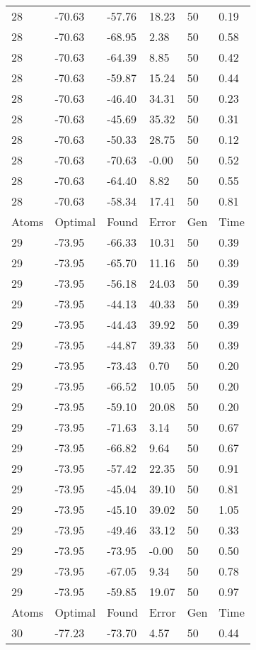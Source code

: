 \documentclass{report}
\begin{document}
\begin{appendix}
\begin{longtable}{llllll}
28 & -70.63 & -57.76 & 18.23 & 50 & 0.19 \\
28 & -70.63 & -68.95 & 2.38 & 50 & 0.58 \\
28 & -70.63 & -64.39 & 8.85 & 50 & 0.42 \\
28 & -70.63 & -59.87 & 15.24 & 50 & 0.44 \\
28 & -70.63 & -46.40 & 34.31 & 50 & 0.23 \\
28 & -70.63 & -45.69 & 35.32 & 50 & 0.31 \\
28 & -70.63 & -50.33 & 28.75 & 50 & 0.12 \\
28 & -70.63 & -70.63 & -0.00 & 50 & 0.52 \\
28 & -70.63 & -64.40 & 8.82 & 50 & 0.55 \\
28 & -70.63 & -58.34 & 17.41 & 50 & 0.81 \\
Atoms & Optimal & Found & Error & Gen & Time \\
29 & -73.95 & -66.33 & 10.31 & 50 & 0.39 \\
29 & -73.95 & -65.70 & 11.16 & 50 & 0.39 \\
29 & -73.95 & -56.18 & 24.03 & 50 & 0.39 \\
29 & -73.95 & -44.13 & 40.33 & 50 & 0.39 \\
29 & -73.95 & -44.43 & 39.92 & 50 & 0.39 \\
29 & -73.95 & -44.87 & 39.33 & 50 & 0.39 \\
29 & -73.95 & -73.43 & 0.70 & 50 & 0.20 \\
29 & -73.95 & -66.52 & 10.05 & 50 & 0.20 \\
29 & -73.95 & -59.10 & 20.08 & 50 & 0.20 \\
29 & -73.95 & -71.63 & 3.14 & 50 & 0.67 \\
29 & -73.95 & -66.82 & 9.64 & 50 & 0.67 \\
29 & -73.95 & -57.42 & 22.35 & 50 & 0.91 \\
29 & -73.95 & -45.04 & 39.10 & 50 & 0.81 \\
29 & -73.95 & -45.10 & 39.02 & 50 & 1.05 \\
29 & -73.95 & -49.46 & 33.12 & 50 & 0.33 \\
29 & -73.95 & -73.95 & -0.00 & 50 & 0.50 \\
29 & -73.95 & -67.05 & 9.34 & 50 & 0.78 \\
29 & -73.95 & -59.85 & 19.07 & 50 & 0.97 \\
Atoms & Optimal & Found & Error & Gen & Time \\
30 & -77.23 & -73.70 & 4.57 & 50 & 0.44 \\

\end{longtable}
\end{appendix}
\end{document}
